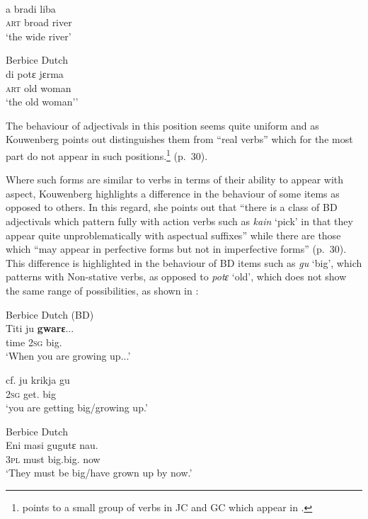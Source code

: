 \ex
{}\\
\gll        a bradi liba \\
	\textsc{art} broad river    \\
\glt      `the wide river'

\ex
Berbice Dutch\\
\gll        di potɛ jɛrma   \\
	\textsc{art} old woman  \\
\glt `the old woman''  \z \z

The behaviour of adjectivals in this position seems quite uniform and
as Kouwenberg points out distinguishes them from ``real verbs'' which
for the most part do not appear in such positions.\footnote{\citet{Winford1993} points to a small group of   verbs in JC and GC which appear in .} (p.~30).

Where such forms are similar to verbs in terms of their ability to
appear with  aspect, Kouwenberg highlights a difference in
the behaviour of some items as opposed to others.  In this regard, she
points out that ``there is a class of BD adjectivals which pattern
fully with action verbs such as \textit{kain} `pick' in that they
appear quite unproblematically with aspectual suffixes” while there
are those which ``may appear in perfective forms but not in
imperfective forms” (p.~30).  This difference is highlighted in the
behaviour of BD items such as \textit{gu} `big', which patterns with
Non-stative verbs, as opposed to \textit{potɛ} `old', which does not
show the same range of possibilities, as shown in :\largerpage[2]

\ea%
\label{ex:3:13}
\citep[30]{Kouwenberg1996} \ea
Berbice Dutch (BD)\\
\gll  Titi      ju \textbf{gwarɛ}...       \\
         time \textsc{2sg} big.{\IPF}        \\
\glt `When you are growing up...'

cf. \gll  ju krikja gu\\
\textsc{2sg} get.{\IPF} big\\
\glt `you are getting big\slash growing up.'


\ex
Berbice Dutch\\
\gll         Eni masi gugutɛ nau.          \\
	\textsc{3pl} must big.big.{\PF} now                   \\
\glt       `They must be big\slash have grown up by now.'

